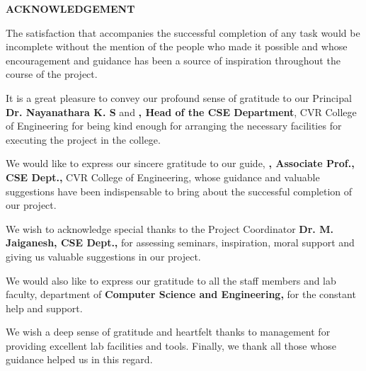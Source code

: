 \documentclass[../Report.tex]{subfiles}
\begin{document}
\begin{center}
    \textbf{ACKNOWLEDGEMENT}
\end{center}

The satisfaction that accompanies the successful completion of any task would be incomplete without the mention of the people who made it 
possible and whose encouragement and guidance has been a source of inspiration throughout the course of the project.\par

It is a great pleasure to convey our profound sense of gratitude to our Principal \textbf{Dr. Nayanathara K. S} and 
\textbf{\hodName, Head of the CSE Department}, CVR College of Engineering for being kind enough for arranging the necessary facilities 
for executing the project in the college.\par

We would like to express our sincere gratitude to our guide, \textbf{\guideName, Associate Prof., CSE Dept.,} CVR College of Engineering,
whose guidance and valuable suggestions have been indispensable to bring
about the successful completion of our project.\par

We wish to acknowledge special thanks to the Project Coordinator \textbf{Dr. M. Jaiganesh, CSE Dept.,} for assessing seminars, 
inspiration, moral support and giving us valuable suggestions in our project.\par

We would also like to express our gratitude to all the staff members and lab faculty, department of 
\textbf{Computer Science and Engineering,} \textbf{\collegeName} for the constant help and support.\par

We wish a deep sense of gratitude and heartfelt thanks to management for providing excellent lab facilities and tools. Finally, 
we thank all those whose guidance helped us in this regard. \par

\pagebreak
\end{document}
